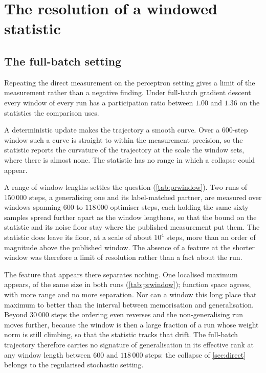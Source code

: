 \documentclass[twoside]{article}
\begin{document}
\section{The resolution of a windowed statistic}\label{app:resolution}

\subsection{The full-batch setting}\label{app:fb}

Repeating the direct measurement on the perceptron setting gives a limit of the measurement rather
than a negative finding. Under full-batch gradient descent every
window of every run has a participation ratio between $1.00$ and $1.36$ on the statistics the
comparison uses.

A deterministic update makes the trajectory a smooth curve. Over a $600$-step window such a curve
is straight to within the measurement precision, so the statistic reports the curvature of the
trajectory at the scale the window sets, where there is almost none. The statistic has no range
in which a collapse could appear.

A range of window lengths settles the question (\cref{tab:prwindow}). Two runs of $150\,000$ steps,
a generalising one and its label-matched partner, are measured over windows spanning $600$ to
$118\,000$ optimiser steps, each holding the same sixty samples spread further apart as the window
lengthens, so that the bound on the statistic and its noise floor stay where the published
measurement put them. The statistic does leave its floor, at a scale of about $10^4$ steps, more than an order of magnitude above the published window. The absence of a feature at the shorter window was
therefore a limit of resolution rather than a fact about the run.

The feature that appears there separates nothing. One localised maximum appears, of the same size
in both runs (\cref{tab:prwindow}); function space agrees, with more range and no more separation.
Nor can a window this long place that maximum to better than the interval between memorisation and
generalisation. Beyond $30\,000$ steps the ordering even reverses and the non-generalising run
moves further, because the window is then a large fraction of a run whose weight norm is still
climbing, so that the statistic tracks that drift. The full-batch trajectory therefore carries no
signature of generalisation in its effective rank at any window length between $600$ and
$118\,000$ steps: the collapse of \cref{sec:direct} belongs to the regularised stochastic
setting.
\end{document}
